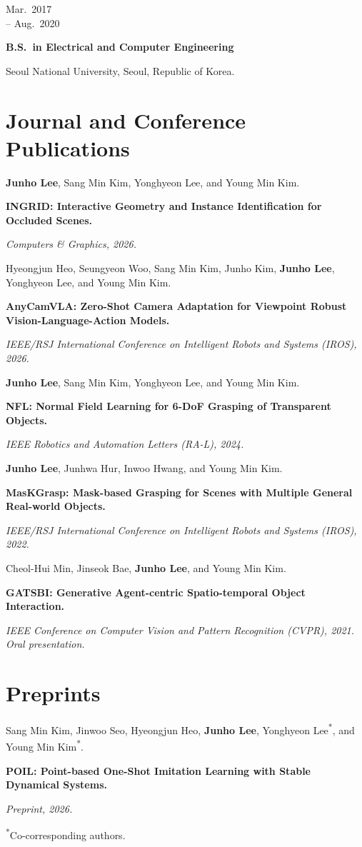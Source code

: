 \documentclass[11pt,a4paper]{article}
\newlength{\datewidth}
\newcommand{\datedentry}[3]{%
  \par\noindent
  \begin{minipage}[t]{\datewidth}
    \raggedright\small #1
  \end{minipage}\hspace{0.15in}%
  \begin{minipage}[t]{\dimexpr\linewidth-\datewidth-0.15in\relax}
    \textbf{#2}\par
    #3
  \end{minipage}\par\vspace{0.5em}}
\newcommand{\publication}[4]{%
  \item\begin{minipage}[t]{\linewidth}
    #1\par
    \textbf{#2}\par
    \textit{#3}\par
    {\small #4}
  \end{minipage}}
\begin{document}
\datedentry{Mar.\ 2017\\-- Aug.\ 2020}
{B.S.\ in Electrical and Computer Engineering}
{Seoul National University, Seoul, Republic of Korea.}

\section{Journal and Conference Publications}

\begin{publications}
\publication
  {\textbf{Junho Lee}, Sang Min Kim, Yonghyeon Lee, and Young Min Kim.}
  {INGRID: Interactive Geometry and Instance Identification for Occluded Scenes.}
  {Computers \& Graphics, 2026.}
  {}

\publication
  {Hyeongjun Heo, Seungyeon Woo, Sang Min Kim, Junho Kim, \textbf{Junho Lee},
   Yonghyeon Lee, and Young Min Kim.}
  {AnyCamVLA: Zero-Shot Camera Adaptation for Viewpoint Robust
   Vision-Language-Action Models.}
  {IEEE/RSJ International Conference on Intelligent Robots and Systems (IROS), 2026.}
  {}

\publication
  {\textbf{Junho Lee}, Sang Min Kim, Yonghyeon Lee, and Young Min Kim.}
  {NFL: Normal Field Learning for 6-DoF Grasping of Transparent Objects.}
  {IEEE Robotics and Automation Letters (RA-L), 2024.}
  {}

\publication
  {\textbf{Junho Lee}, Junhwa Hur, Inwoo Hwang, and Young Min Kim.}
  {MasKGrasp: Mask-based Grasping for Scenes with Multiple General Real-world Objects.}
  {IEEE/RSJ International Conference on Intelligent Robots and Systems (IROS), 2022.}
  {}

\publication
  {Cheol-Hui Min, Jinseok Bae, \textbf{Junho Lee}, and Young Min Kim.}
  {GATSBI: Generative Agent-centric Spatio-temporal Object Interaction.}
  {IEEE Conference on Computer Vision and Pattern Recognition (CVPR), 2021.
   Oral presentation.}
  {}
\end{publications}

\section{Preprints}

\begin{publications}[start=6]
\publication
  {Sang Min Kim, Jinwoo Seo, Hyeongjun Heo, \textbf{Junho Lee},
   Yonghyeon Lee\textsuperscript{*}, and Young Min Kim\textsuperscript{*}.}
  {POIL: Point-based One-Shot Imitation Learning with Stable Dynamical Systems.}
  {Preprint, 2026.}
  {\textsuperscript{*}Co-corresponding authors.}
\end{publications}
\end{document}

